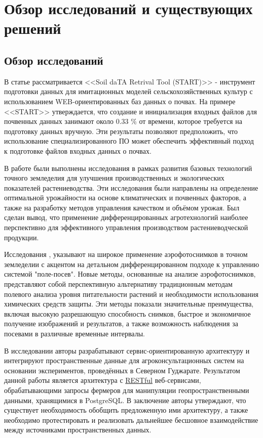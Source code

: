     
\chapter{Обзор исследований и существующих решений}
    \section{Обзор исследований}

    В статье \cite{elsevier} рассматривается  <<Soil daTA Retrival Tool (START)>> - инструмент подготовки данных для имитационных моделей сельскохозяйственных культур с использованием WEB-ориентированных баз данных о почвах. На примере <<START>> утверждается, что создание и инициализация входных файлов для почвенных данных занимают около 0.33 \% от времени, которое требуется на подготовку данных вручную. Эти результаты позволяют предположить, что использование специализированного ПО может обеспечить эффективный подход к подготовке файлов входных данных о почвах. 
    
    В работе \cite{busel} были выполнены исследования в рамках развития базовых технологий точного земледелия для улучшения производственных и экологических показателей растениеводства. Эти исследования были направлены на определение оптимальной урожайности на основе климатических и почвенных факторов, а также на разработку методов управления качеством и объёмом урожая. Был сделан вывод, что применение дифференцированных агротехнологий наиболее перспективно для эффективного управления производством растениеводческой продукции. 

    Исследования \cite{aero1}, \cite{aero2} указывают на широкое применение аэрофотоснимков в точном земледелии с акцентом на детальном дифференцированном подходе к управлению системой "поле-посев". Новые методы, основанные на анализе аэрофотоснимков, представляют собой перспективную альтернативу традиционным методам полевого анализа уровня питательности растений и необходимости использования химических средств защиты. Эти методы показали значительные преимущества, включая высокую разрешающую способность снимков, быстрое и экономичное получение изображений и результатов, а также возможность наблюдения за посевами в различные временные интервалы.
    
    В исследовании \cite{service} авторы разрабатывают сервис-ориентированную архитектуру и интегрируют пространственные данные для агроконсультационных систем на основании экспериментов, проведённых в Северном Гуджарате.
    Результатом данной работы является архитектура с \hyperref[REST]{RESTful} веб-сервисами, обрабатывающими запросы фермеров для манипуляции геопространственными данными, хранящимися в PostgreSQL. В заключение авторы утверждают, что существует необходимость обобщить предложенную ими архитектуру, а также необходимо протестировать и реализовать дальнейшее бесшовное взаимодействие между источниками пространственных данных.
    

